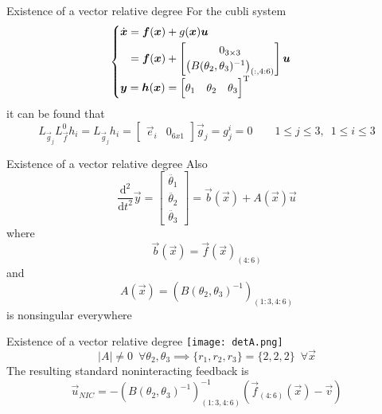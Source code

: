 \begin{frame}{Existence of a vector relative degree \cubli}
  For the cubli system
  \[
  \begin{cases}
    \begin{split}
      \dot{\boldsymbol{x}} &= \boldsymbol{f}(\boldsymbol{x}) + g(\boldsymbol{x})\boldsymbol{u}\\
      &=\boldsymbol{f}(\boldsymbol{x}) +
      \begin{bmatrix}
        0_{3\times3} \\
        \left(B(\theta_2,\theta_3) ^ {-1}\right)_{(:, 4:6)}
      \end{bmatrix}\boldsymbol{u}\\
    \end{split}\\
    \boldsymbol{y} = \boldsymbol{h}(\boldsymbol{x}) =
    \begin{bmatrix}
      \theta_1 &
      \theta_2 &
      \theta_3
    \end{bmatrix} ^{\mathrm{T}}
  \end{cases}
  \]
  it can be found that
  \[
  L_{\vec{g}_{j}}L_{\vec{f}}^{0}h_{i} =
  L_{\vec{g}_{j}}h_{i} = 
  \begin{bmatrix}
    \vec{e}_i & 0_{6x1}
  \end{bmatrix}
  \vec{g}_j
  =
  g_{j}^{i} = 0
  \qquad 1 \le j \le 3, \enspace 1 \le i \le 3
  \]

\end{frame}

\begin{frame}{Existence of a vector relative degree \cubli}
  Also 
  \[
  \frac{\mathrm{d}^{2}}{\mathrm{d}t^{2}}\vec{y} = 
  \begin{bmatrix}
    \ddot{\theta_1}\\
    \ddot{\theta_2}\\
    \ddot{\theta_3}
  \end{bmatrix} =
  \vec{b}(\vec{x}) + A(\vec{x}) \vec{u}
  \]
  where
  \[
  \vec{b}(\vec{x}) = \vec{f}(\vec{x})_{(4:6)}
  \]
  and
  \[
  A(\vec{x}) = \left(B(\theta_2,\theta_3) ^ {-1}\right)_{(1:3, 4:6)}
  \]
  is \alert{nonsingular} everywhere

\end{frame}

\begin{frame}{Existence of a vector relative degree \cubli}
  \centering
  \texttt{[image: detA.png]}
  \[
  |A| \ne 0 \enspace \forall \theta_2, \theta_3 \implies \{r_1, r_2, r_3\} = \{2,2,2\} \enspace \forall \vec{x}
  \]
  The resulting standard noninteracting feedback is
  \[
  \vec{u}_{NIC} = -\left(B(\theta_2,\theta_3) ^ {-1}\right)_{(1:3, 4:6)}^{-1}
  (\vec{f}_{(4:6)}(\vec{x}) - \vec{v} )
  \]
\end{frame}

